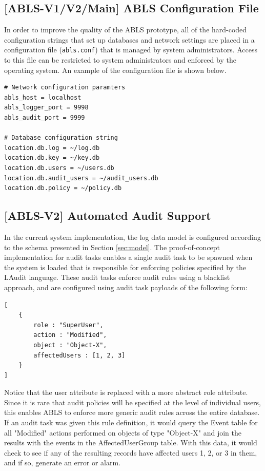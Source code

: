 \documentclass{sig-alternate}
\begin{document}
\subsection{[ABLS-V1/V2/Main] ABLS Configuration File} 
In order to improve the quality of the ABLS prototype, all of the hard-coded configuration strings that set up databases and 
network settings are placed in a configuration file ({\tt abls.conf}) that is managed by system administrators.
Access to this file can be restricted to system administrators and enforced by the 
operating system. An example of the configuration file is shown below.

\begin{lstlisting}
# Network configuration paramters
abls_host = localhost
abls_logger_port = 9998
abls_audit_port = 9999

# Database configuration string
location.db.log = ~/log.db
location.db.key = ~/key.db
location.db.users = ~/users.db
location.db.audit_users = ~/audit_users.db
location.db.policy = ~/policy.db
\end{lstlisting}

\subsection{[ABLS-V2] Automated Audit Support}
In the current system implementation, the log data model is configured according to the schema presented in
Section \ref{sec:model}. The proof-of-concept implementation for audit tasks enables a single audit task to be
spawned when the system is loaded that is responsible for enforcing policies specified by the LAudit language.
These audit tasks enforce audit rules using a blacklist approach, and are configured using audit task payloads
of the following form:

\begin{lstlisting}
[
    {
        role : "SuperUser",
        action : "Modified",
        object : "Object-X",
        affectedUsers : [1, 2, 3]
    }
]
\end{lstlisting}

Notice that the user attribute is replaced with a more abstract role attribute. Since it is rare that audit policies will
be specified at the level of individual users, this enables ABLS to enforce more generic audit rules across the 
entire database. If an audit task was given this rule definition, it would query the Event table for all
"Modified" actions performed on objects of type "Object-X" and join the results with the events in the AffectedUserGroup
table. With this data, it would check to see if any of the resulting records have affected users 1, 2, or 3 in them, and if
so, generate an error or alarm. 
\end{document}
